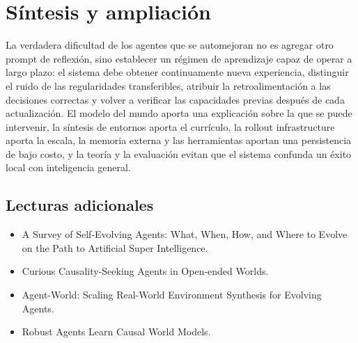 \section{Síntesis y ampliación}

La verdadera dificultad de los agentes que se automejoran no es agregar otro prompt de reflexión, sino establecer un régimen de aprendizaje capaz de operar a largo plazo: el sistema debe obtener continuamente nueva experiencia, distinguir el ruido de las regularidades transferibles, atribuir la retroalimentación a las decisiones correctas y volver a verificar las capacidades previas después de cada actualización. El modelo del mundo aporta una explicación sobre la que se puede intervenir, la síntesis de entornos aporta el currículo, la rollout infrastructure aporta la escala, la memoria externa y las herramientas aportan una persistencia de bajo costo, y la teoría y la evaluación evitan que el sistema confunda un éxito local con inteligencia general.

\subsection{Lecturas adicionales}

\begin{itemize}
    \item A Survey of Self-Evolving Agents: What, When, How, and Where to Evolve on the Path to Artificial Super Intelligence.
    \item Curious Causality-Seeking Agents in Open-ended Worlds.
    \item Agent-World: Scaling Real-World Environment Synthesis for Evolving Agents.
    \item Robust Agents Learn Causal World Models.
\end{itemize}


